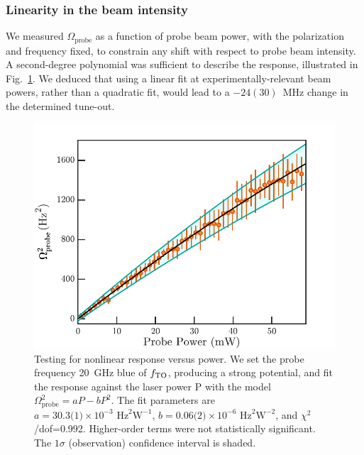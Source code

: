 \subsubsection{Linearity in the beam intensity}
	
	We measured \(\Omega_{\mathrm{probe}}\) as a function of probe beam power, with the polarization and frequency fixed, to constrain any shift with respect to probe beam intensity. A second-degree polynomial was sufficient to describe the response, illustrated in Fig.~\ref{fig:probe_beam_linearity}. 
	We deduced that using a linear fit at experimentally-relevant beam powers, rather than a quadratic fit, would lead to a  \(-24(30)\)~MHz change in the determined tune-out.

		\begin{figure}
	    \begin{minipage}{0.58\textwidth}
	    \vspace{0pt}
	    \includegraphics[width=\textwidth]{fig/tuneout/probe_beam_linearity}
	    \end{minipage}
	    \hfill
	    \begin{minipage}{0.4\textwidth}
	    \vspace{0pt}
	    \caption{Testing for nonlinear response versus power. We set the  probe frequency 20~GHz blue of $f_\mathrm{TO}$,  producing a strong potential, and fit the response against the laser power P with the model \( \Omega_{\mathrm{probe}}^2 = a  P - b P^2 \).  The fit parameters are \(a=\text{30.3(1)}\times 10^{-3}\text{~Hz}^2\text{W}^{-1}\), \(b= \text{0.06(2)} \times 10^{-6}\text{~Hz}^2\text{W}^{-2}\), and $\chi^2$/dof=0.992. Higher-order terms  were not statistically significant. The \(1\sigma\) (observation) confidence interval is shaded. 	    }
	    \label{fig:probe_beam_linearity}
	    \end{minipage}
	\end{figure}




